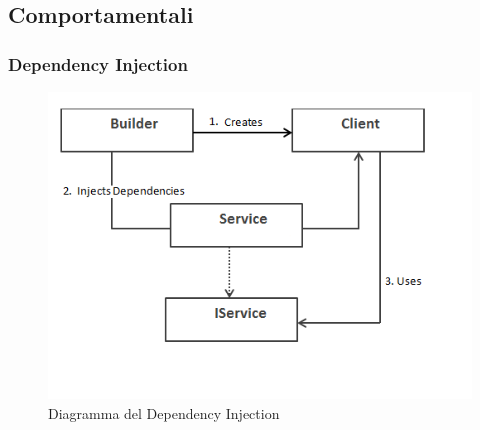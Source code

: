 	\subsection{ Comportamentali}

		\subsubsection{Dependency Injection}
		\begin{figure}[H]
		\centering
		\includegraphics[width=0.5\linewidth]{GraficiAppendici/dependency.png}
		\caption{Diagramma del  Dependency Injection}
	\end{figure}
